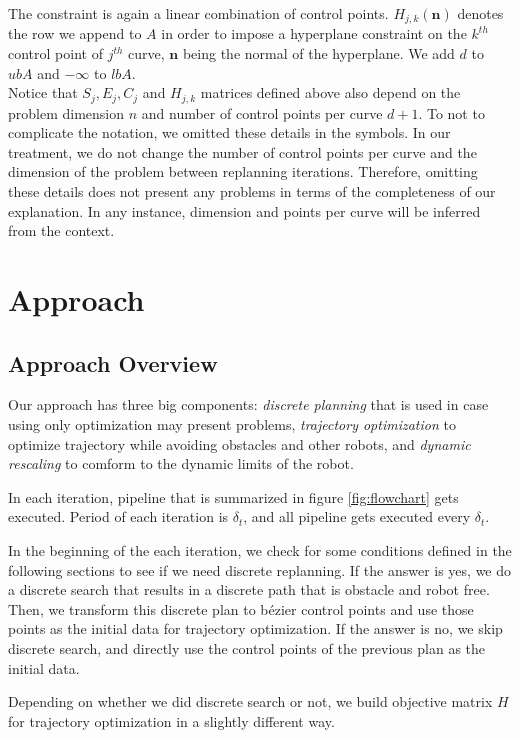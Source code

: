 \documentclass{svproc}
\newcommand{\vn}{\mathbf{n}}
\begin{document}
The constraint is again a linear combination of control points. $H_{j,k}(\vn)$ denotes the row we append to $A$ in order to impose a hyperplane constraint on the $k^{th}$ control point of $j^{th}$ curve, $\vn$ being the normal of the hyperplane. We add $d$ to $ubA$ and $-\infty$ to $lbA$.
\\

Notice that $S_j, E_j, C_j$ and $H_{j,k}$ matrices defined above also depend on the problem dimension $n$ and number of control points per curve $d+1$. To not to complicate the notation, we omitted these details in the symbols. In our treatment, we do not change the number of control points per curve and the dimension of the problem between replanning iterations. Therefore, omitting these details does not present any problems in terms of the completeness of our explanation. In any instance, dimension and points per curve will be inferred from the context.
\section{Approach}


\subsection{Approach Overview}
Our approach has three big components: \emph{discrete planning} that is used in case using only optimization may present problems, \emph{trajectory optimization} to optimize trajectory while avoiding obstacles and other robots, and \emph{dynamic rescaling} to comform to the dynamic limits of the robot.

In each iteration, pipeline that is summarized in figure \ref{fig:flowchart} gets executed. Period of each iteration is $\delta_t$, and all pipeline gets executed every $\delta_t$.

In the beginning of the each iteration, we check for some conditions defined in the following sections to see if we need discrete replanning. If the answer is yes, we do a discrete search that results in a discrete path that is obstacle and robot free. Then, we transform this discrete plan to b\'ezier control points and use those points as the initial data for trajectory optimization. If the answer is no, we skip discrete search, and directly use the control points of the previous plan as the initial data.

Depending on whether we did discrete search or not, we build objective matrix $H$ for trajectory optimization in a slightly different way.
\end{document}
